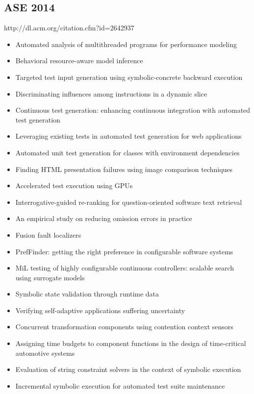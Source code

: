 \subsection{ASE 2014}

http://dl.acm.org/citation.cfm?id=2642937

{\small
\begin{itemize}[itemsep=-1ex]
  \item Automated analysis of multithreaded programs for performance modeling
  \item Behavioral resource-aware model inference
  \item Targeted test input generation using symbolic-concrete backward execution
  \item Discriminating influences among instructions in a dynamic slice
  \item Continuous test generation: enhancing continuous integration with automated test generation
  \item Leveraging existing tests in automated test generation for web applications
  \item Automated unit test generation for classes with environment dependencies
  \item Finding HTML presentation failures using image comparison techniques
  \item Accelerated test execution using GPUs
  \item Interrogative-guided re-ranking for question-oriented software text retrieval
  \item An empirical study on reducing omission errors in practice
  \item Fusion fault localizers
  \item PrefFinder: getting the right preference in configurable software systems
  \item MiL testing of highly configurable continuous controllers: scalable search using surrogate models
  \item Symbolic state validation through runtime data
  \item Verifying self-adaptive applications suffering uncertainty
  \item Concurrent transformation components using contention context sensors
  \item Assigning time budgets to component functions in the design of time-critical automotive systems
  \item Evaluation of string constraint solvers in the context of symbolic execution
  \item Incremental symbolic execution for automated test suite maintenance

\end{itemize}}
